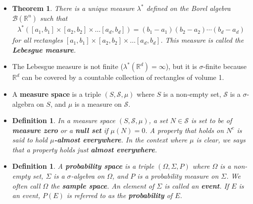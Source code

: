 \documentclass[10pt]{article}
\newtheorem{theorem}[lemma]{Theorem}
\newtheorem{definition}[lemma]{Definition}
\newtheorem{proposition}[lemma]{Proposition}
\newcommand{\mcal}[1]{\mathcal{#1}}
\newcommand{\Real}{\mathbb{R}}
\begin{document}
\begin{itemize}
\begin{proposition}
\begin{enumerate}
      \item Let ${E_n \in \mcal{S}: n \in \mcal{N}}$ be a collection of sets where $E_n \supset E_{n+1}$ for all $n$, and $\mu(E_1) < \infty$, then
      \begin{align*}
        \mu\bigg( \bigcap_{n=1}^\infty E_n \bigg) = \lim_{n \rightarrow \infty} \mu(E_n)
      \end{align*}
    \end{enumerate}
  \end{proposition}

  \item \begin{theorem}
    There is a unique measure $\lambda^*$ defined on the Borel algebra $\mcal{B}(\Real^n)$ such that
    \begin{align*}
      \lambda^*([a_1,b_1] \times [a_2,b_2] \times \dotsc [a_d,b_d]) = (b_1 - a_1)(b_2 - a_2) \dotsm (b_d - a_d)
    \end{align*}
    for all rectangles $[a_1,b_1] \times [a_2,b_2] \times \dotsc [a_d,b_d]$. This measure is called the {\bf Lebesgue measure}.
  \end{theorem}

  \item The Lebesgue measure is not finite ($\lambda^*(\Real^d) = \infty$), but it is $\sigma$-finite because $\Real^d$ can be covered by a countable collection of rectangles of volume 1.

  \item A {\bf measure space} is a triple $(S, \mcal{S}, \mu)$ where $S$ is a non-empty set, $\mcal{S}$ is a $\sigma$-algebra on $S$, and $\mu$ is a measure on $\mcal{S}$.
  
  \item \begin{definition}
    In a measure space $(S, \mcal{S}, \mu)$, a set $N \in \mcal{S}$ is set to be of {\bf measure zero} or a {\bf null set} if $\mu(N) = 0$. A property that holds on $N^c$ is said to hold {\bf $\mu$-almost everywhere}. In the context where $\mu$ is clear, we says that a property holds just {\bf almost everywhere}.
  \end{definition}
  
  \item \begin{definition}
    A {\bf probability space} is a triple $(\Omega, \Sigma, P)$ where $\Omega$ is a non-empty set, $\Sigma$ is a $\sigma$-algebra on $\Omega$, and $P$ is a probability measure on $\Sigma$. We often call $\Omega$ the {\bf sample space}. An element of $\Sigma$ is called an {\bf event}. If $E$ is an event, $P(E)$ is referred to as the {\bf probability} of $E$.
  \end{definition}
\end{itemize}
\end{document}
